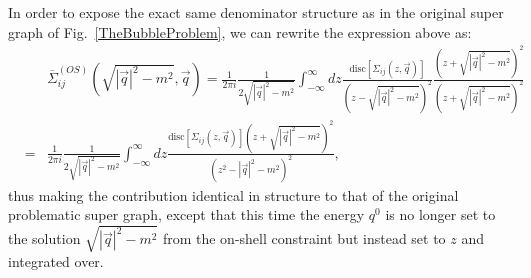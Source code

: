 \documentclass[11pt]{article}
\begin{document}
In order to expose the exact same denominator structure as in the original super graph of Fig.~\ref{TheBubbleProblem}, we can rewrite the expression above as:
\begin{eqnarray}
&&\overline{\Sigma}_{ij}^{(OS)}(\sqrt{|\vec{q}|^2-m^2 }, \vec{q}) = 
\frac{ 1 }{2\pi i} \frac{1}{2\sqrt{|\vec{q}|^2-m^2 }} \int_{-\infty}^\infty d z \frac{ 
\textrm{disc} \left[ \Sigma_{ij}(z, \vec{q}) \right]
}{\left( z-\sqrt{|\vec{q}|^2-m^2 }\right)^2 } \frac{\left( z + \sqrt{|\vec{q}|^2-m^2 }\right)^2}{\left( z + \sqrt{|\vec{q}|^2-m^2 }\right)^2} \nonumber \\
&=& 
\frac{ 1 }{2\pi i} \frac{1}{2\sqrt{|\vec{q}|^2-m^2 }} \int_{-\infty}^\infty d z \frac{ 
\textrm{disc} \left[ \Sigma_{ij}(z, \vec{q}) \right] \left( z + \sqrt{|\vec{q}|^2-m^2 }\right)^2
}{( z^2 - |\vec{q}|^2-m^2)^2 },\label{FinalExpressionBubbleProblemWithMatchingProps}
\end{eqnarray}
thus making the contribution identical in structure to that of the original problematic super graph, except that this time the energy $q^0$ is no longer set to the solution $\sqrt{|\vec{q}|^2-m^2}$ from the on-shell constraint but instead set to $z$ and integrated over.
\end{document}
